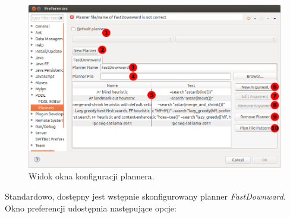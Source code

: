 \begin{figure}[h!]
    \centering
    \includegraphics[width=\textwidth]{img/planner_preferences_window}
    \caption{Widok okna konfiguracji plannera.}
    \label{fig:preferences_window}
\end{figure}
Standardowo, dostępny jest wstępnie skonfigurowany planner \textit{FastDownward}. Okno preferencji udostępnia następujące opcje:

